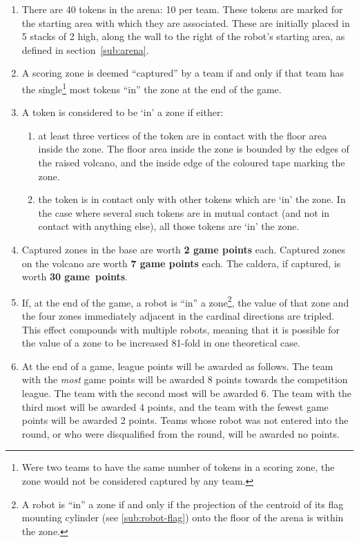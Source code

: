 \begin{enumerate}
\item There are 40 tokens in the arena: 10 per team. These tokens are marked for the starting area with which they are associated. These are initially placed in 5 stacks of 2 high, along the wall to the right of the robot's starting area, as defined in section~\ref{sub:arena}.

\item A scoring zone is deemed ``captured'' by a team if and only if that team has the single\footnote{Were two teams to have the same number of tokens in a scoring zone, the zone would not be considered captured by any team.} most tokens ``in'' the zone at the end of the game.

\item A token is considered to be `in' a zone if either:
\begin{enumerate}
  \item at least three vertices of the token are in contact with the floor area inside the zone. The floor area inside the zone is bounded by the edges of the raised volcano, and the inside edge of the coloured tape marking the zone.
  \item the token is in contact only with other tokens which are `in' the zone. In the case where several such tokens are in mutual contact (and not in contact with anything else), all those tokens are `in' the zone.
\end{enumerate}

\item Captured zones in the base are worth \textbf{2 game points} each. Captured zones on the volcano are worth \textbf{7 game points} each. The caldera, if captured, is worth \textbf{30 game~points}.

\item If, at the end of the game, a robot is ``in'' a zone\footnote{A robot is ``in'' a zone if and only if the projection of the centroid of its flag mounting cylinder (see \ref{sub:robot-flag}) onto the floor of the arena is within the zone.}, the value of that zone and the four zones immediately adjacent in the cardinal directions are tripled. This effect compounds with multiple robots, meaning that it is possible for the value of a zone to be increased 81-fold in one theoretical case.

\item At the end of a game, league points will be awarded as follows.
      The team with the \emph{most} game points will be awarded 8 points towards the competition league.
      The team with the second most will be awarded 6.
      The team with the third most will be awarded 4 points, and the team with the fewest game points will be awarded 2 points.
      Teams whose robot was not entered into the round, or who were disqualified from the round, will be awarded no points.


\end{enumerate}
